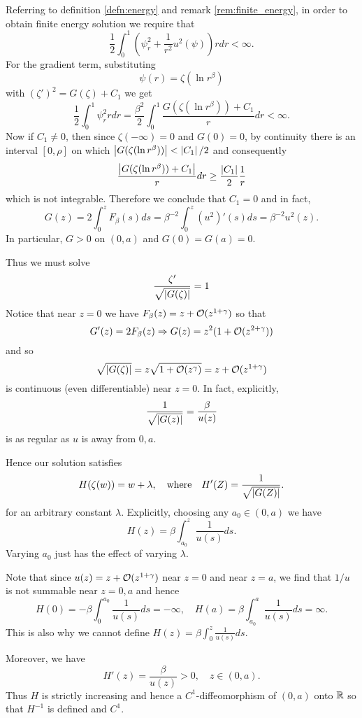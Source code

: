 \documentclass{amsart}
\begin{document}
Referring to definition \ref{defn:energy} and remark \ref{rem:finite_energy}, in order to obtain finite energy solution we require that
\[
\frac{1}{2} \int_0^1 \left(\psi_r^2 + \frac{1}{r^2} u^2(\psi)\right) r dr < \infty.
\]
For the gradient term, substituting
\[
\psi(r) = \zeta(\ln r^{\beta})
\]
with \((\zeta')^2 = G(\zeta) + C_1\) we get
\[
\frac{1}{2} \int_0^1 \psi_r^2 r dr  = \frac{\beta^2}{2} \int_0^1 \frac{G(\zeta(\ln r^{\beta})) + C_1}{r} dr < \infty.
\]
Now if \(C_1 \ne 0\), then since \(\zeta(-\infty) = 0\) and \(G(0) = 0\), by continuity there is an interval \([0, \rho]\) on which \(\left|{G(\zeta(\ln r^{\beta}))}\right| < \left|{C_1}\right|/2\) and consequently
\[
\frac{\left|{G(\zeta(\ln r^{\beta})) + C_1}\right|}{r} dr \geq \frac{\left|{C_1}\right|}{2} \frac{1}{r}
\]
which is not integrable. Therefore we conclude that \(C_1 = 0\) and in fact,
\begin{equation}
\label{eq:G}
G(z) = 2 \int_0^z F_{\beta} (s) ds = \beta^{-2} \int_0^z (u^2)' (s) ds = \beta^{-2} u^2 (z).
\end{equation}
In particular, \(G > 0\) on \((0,a)\) and \(G(0) = G(a) = 0\).

Thus we must solve
\[
\frac{\zeta'}{\sqrt{\left|{G(\zeta)}\right|}} = 1
\]
Notice that near \(z = 0\) we have \(F_{\beta} (z) = z + \operatorname{\mathcal{O}}(z^{1+\gamma})\) so that
\[
G'(z) = 2F_{\beta}(z) \Rightarrow G(z) = z^2(1 + \operatorname{\mathcal{O}}(z^{2 + \gamma}))
\]
and so
\[
\sqrt{\left|{G(\zeta)}\right|} = z \sqrt{1 + \operatorname{\mathcal{O}}(z^{\gamma})} = z + \operatorname{\mathcal{O}}(z^{1 + \gamma})
\]
is continuous (even differentiable) near \(z = 0\). In fact, explicitly,
\[
\frac{1}{\sqrt{\left|{G(z)}\right|}} = \frac{\beta}{u(z)}
\]
is as regular as \(u\) is away from \(0, a\).

Hence our solution satisfies
\[
H (\zeta(w)) = w + \lambda, \quad \text{where} \quad H'(Z) = \frac{1}{\sqrt{\left|{G(Z)}\right|}}.
\]
for an arbitrary constant \(\lambda\). Explicitly, choosing any \(a_0 \in (0, a)\) we have
\begin{equation}
\label{eq:H}
H(z) = \beta \int_{a_0}^z \frac{1}{u(s)} ds.
\end{equation}
Varying \(a_0\) just has the effect of varying \(\lambda\).

Note that since \(u(z) = z + \operatorname{\mathcal{O}}(z^{1 + \gamma})\) near \(z=0\) and near \(z=a\), we find that \(1/u\) is not summable near \(z = 0, a\) and hence
\[
H(0) = -\beta \int_0^{a_0} \frac{1}{u(s)} ds = - \infty, \quad H(a) = \beta \int_{a_0}^a \frac{1}{u(s)} ds = \infty.
\]
This is also why we cannot define \(H(z) = \beta \int_{0}^z \frac{1}{u(s)} ds\).

Moreover, we have
\[
H'(z) = \frac{\beta}{u(z)} > 0, \quad z \in (0, a).
\]
Thus \(H\) is strictly increasing and hence a \(C^1\)-diffeomorphism of \((0, a)\) onto \(\mathbb{R}\) so that \(H^{-1}\) is defined and \(C^1\).
\end{document}
